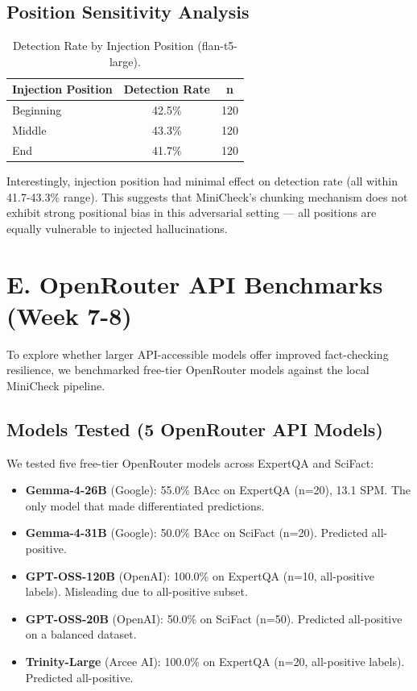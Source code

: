 \documentclass[12pt, letterpaper]{article}
\begin{document}
\subsection*{Position Sensitivity Analysis}

\begin{table}[H]
\centering
\caption{Detection Rate by Injection Position (flan-t5-large).}
\begin{tabular}{lcc}
\toprule
\textbf{Injection Position} & \textbf{Detection Rate} & \textbf{n} \\
\midrule
Beginning & 42.5\% & 120 \\
Middle & 43.3\% & 120 \\
End & 41.7\% & 120 \\
\bottomrule
\end{tabular}
\end{table}

Interestingly, injection position had minimal effect on detection rate (all within 41.7-43.3\% range). This suggests that MiniCheck's chunking mechanism does not exhibit strong positional bias in this adversarial setting — all positions are equally vulnerable to injected hallucinations.

\section*{E. OpenRouter API Benchmarks (Week 7-8)}

To explore whether larger API-accessible models offer improved fact-checking resilience, we benchmarked free-tier OpenRouter models against the local MiniCheck pipeline.

\subsection*{Models Tested (5 OpenRouter API Models)}
We tested five free-tier OpenRouter models across ExpertQA and SciFact:
\begin{itemize}
    \item \textbf{Gemma-4-26B} (Google): 55.0\% BAcc on ExpertQA (n=20), 13.1 SPM. The only model that made differentiated predictions.
    \item \textbf{Gemma-4-31B} (Google): 50.0\% BAcc on SciFact (n=20). Predicted all-positive.
    \item \textbf{GPT-OSS-120B} (OpenAI): 100.0\% on ExpertQA (n=10, all-positive labels). Misleading due to all-positive subset.
    \item \textbf{GPT-OSS-20B} (OpenAI): 50.0\% on SciFact (n=50). Predicted all-positive on a balanced dataset.
    \item \textbf{Trinity-Large} (Arcee AI): 100.0\% on ExpertQA (n=20, all-positive labels). Predicted all-positive.
\end{itemize}
\end{document}
